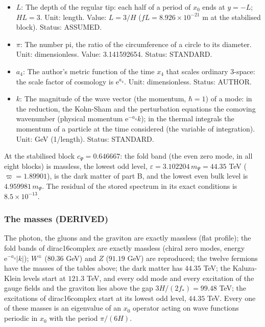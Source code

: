 \documentclass[
  10pt,
]{article}
\begin{document}
\begin{itemize}
\item
  \(L\): The depth of the regular tip: each half of a period of \(x_0\)
  ends at \(y = -L\); \(HL = 3\). Unit: length. Value: \(L = 3/H\)
  (\(fL = 8.926\times10^{-21}\) m at the stabilised block). Status:
  ASSUMED.
\item
  \(\pi\): The number pi, the ratio of the circumference of a circle to
  its diameter. Unit: dimensionless. Value: 3.141592654. Status:
  STANDARD.
\item
  \(a_4\): The author's metric function of the time \(x_4\) that scales
  ordinary 3-space: the scale factor of cosmology is
  \(\mathrm{e}^{a_4}\). Unit: dimensionless. Status: AUTHOR.
\item
  \(k\): The magnitude of the wave vector (the momentum, \(\hbar = 1\))
  of a mode: in the reduction, the Kohn-Sham and the perturbation
  equations the comoving wavenumber (physical momentum
  \(\mathrm{e}^{-a_4}k\)); in the thermal integrals the momentum of a
  particle at the time considered (the variable of integration). Unit:
  GeV (1/length). Status: STANDARD.
\end{itemize}

At the stabilised block \(c_\Psi = 0.646667\): the fold band (the even
zero mode, in all eight blocks) is massless, the lowest odd level,
\(\varepsilon = 3.102204\,m_\Psi = 44.35\) TeV (\(\varpi = 1.89901\)),
is the dark matter of part B, and the lowest even bulk level is
\(4.959981\,m_\Psi\). The residual of the stored spectrum in its exact
conditions is \(8.5\times10^{-13}\).

\hypertarget{the-masses-derived}{%
\subsubsection*{The masses (DERIVED)}\label{the-masses-derived}}

The photon, the gluons and the graviton are exactly massless (flat
profile); the fold bands of dirac16complex are exactly massless (chiral
zero modes, energy \(\mathrm{e}^{-a_4}\lvert k\rvert\)); \(W^\pm\)
(\(80.36\) GeV) and \(Z\) (\(91.19\) GeV) are reproduced; the twelve
fermions have the masses of the tables above; the dark matter has
\(44.35\) TeV; the Kaluza-Klein levels start at \(121.3\) TeV, and every
odd mode and every excitation of the gauge fields and the graviton lies
above the gap \(3H/(2f_*) = 99.48\) TeV; the excitations of
dirac16complex start at its lowest odd level, \(44.35\) TeV. Every one
of these masses is an eigenvalue of an \(x_0\) operator acting on wave
functions periodic in \(x_0\) with the period \(\pi/(6H)\).
\end{document}
